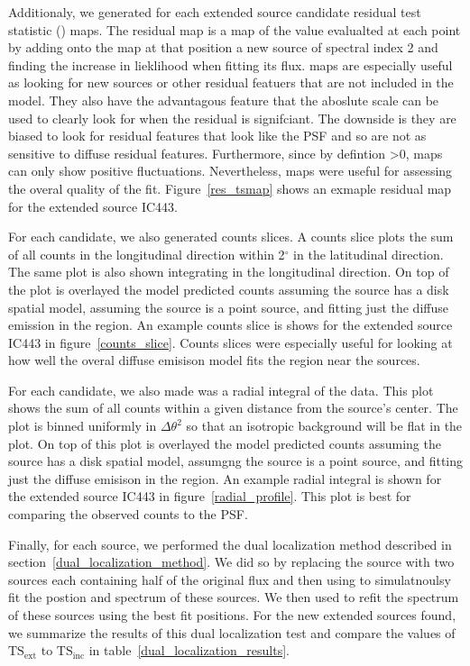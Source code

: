 \documentclass[12pt,preprint]{aastex}
\newcommand{\tsext}{{\ensuremath{\text{TS}_\text{ext}}}\xspace}
\newcommand{\tsinc}{\ensuremath{\text{TS}_\text{inc}}\xspace}
\newcommand{\ts}{\text{TS}\xspace}
\renewcommand{\deg}{\ensuremath{^\circ}\xspace}
\newcommand{\pointlike}{\text{\em pointlike}\xspace}
\newcommand{\gtlike}{\text{\em gtlike}\xspace}
\begin{document}
Additionaly, we generated for each extended source candidate residual
test statistic (\ts) maps.  The residual \ts map is a map of the \ts
value evalualted at each point by adding onto the map at that position
a new source of spectral index 2 and finding the increase in lieklihood
when fitting its flux. \ts maps are especially useful as looking for
new sources or other residual featuers that are not included in the
model. They also have the advantagous feature that the aboslute scale
can be used to clearly look for when the residual is signifciant.
The downside is they are biased to look for residual features
that look like the PSF and so are not as sensitive to diffuse residual
features. Furthermore, since by defintion \ts>0, \ts maps can only show
positive fluctuations. Nevertheless, \ts maps were useful for
assessing the overal quality of the fit. Figure~\ref{res_tsmap}
shows an exmaple residual \ts map for the extended source IC443.


For each candidate, we also generated counts slices. A counts slice
plots the sum of all counts in the longitudinal direction within 2\deg in
the latitudinal direction.  The same plot is also shown integrating in
the longitudinal direction.  On top of the plot is overlayed the model
predicted counts assuming the source has a disk spatial model, assuming
the source is a point source, and fitting just the diffuse emission in
the region.  An example counts slice is shows for the extended source
IC443 in figure~\ref{counts_slice}. Counts slices were especially useful
for looking at how well the overal diffuse emisison model fits the region
near the sources.

For each candidate, we also made was a radial integral of the data. This
plot shows the sum of all counts within a given distance from the
source's center. The plot is binned uniformly in $\Delta \theta^2$ so
that an isotropic background will be flat in the plot. On top of this
plot is overlayed the model predicted counts assuming the source has a
disk spatial model, assumgng the source is a point source, and fitting
just the diffuse emisison in the region. An example radial integral
is shown for the extended source IC443 in figure~\ref{radial_profile}.
This plot is best for comparing the observed counts to the PSF.

Finally, for each source, we performed the dual localization method
described in section~\ref{dual_localization_method}.  We 
did so by replacing the source with two sources each containing
half of the original flux and then using \pointlike to
simulatnoulsy fit the postion and spectrum of these sources.
We then used \gtlike to refit the spectrum of these
sources using the best fit positions. For the
new extended sources found, we summarize the results of
this dual localization test and compare the values of \tsext
to \tsinc in table~\ref{dual_localization_results}.
\end{document}

